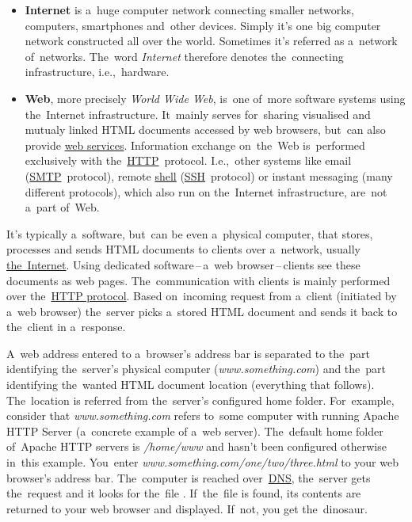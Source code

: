 \label{internetweb}
\begin{itemize}
    \item \textbf{Internet} is a~huge computer network connecting smaller networks, computers, smartphones and~other devices. Simply it's one big computer network constructed all over the world. Sometimes it's referred as a~network of~networks. The~word \textit{Internet} therefore denotes the~connecting infrastructure, i.e.,~hardware.
    \item \textbf{Web}, more precisely \textit{World Wide Web}, is~one of~more software systems using the~Internet infrastructure. It~mainly serves for~sharing visualised and mutualy linked HTML documents accessed by web browsers, but~can also provide \hyperref[webserviceapplication]{web services}. Information exchange on~the~Web is~performed exclusively with the~\hyperref[http]{HTTP}~protocol. I.e.,~other systems like email (\hyperref[smtp]{SMTP}~protocol), remote \hyperref[shellcligui]{shell} (\hyperref[ssh]{SSH}~protocol) or instant messaging (many different protocols), which also run on the~Internet infrastructure, are~not a~part of~Web.
\end{itemize}

\label{namespaces}

\label{webserver}
It's typically a~software, but~can be even a~physical computer, that stores, processes and sends HTML documents to clients over a~network, usually \hyperref[internetweb]{the~Internet}. Using dedicated software\,--\,a~web browser\,--\,clients see these documents as web pages. The~communication with clients is mainly performed over the~\hyperref[http]{HTTP protocol}. Based on~incoming request from a~client (initiated by a~web browser) the~server picks a~stored HTML document and sends it back to the~client in a~response.

A~web address entered to a~browser's address bar is separated to the~part identifying the~server's physical computer (\textit{www.something.com}) and the~part identifying the~wanted HTML document location (everything that follows). The~location is referred from the~server's configured home folder. For~example, consider that \textit{www.something.com} refers to~some computer with running Apache HTTP Server (a~concrete example of a~web server). The~default home folder of~Apache HTTP servers is \textit{/home/www} and hasn't been configured otherwise in~this example. You~enter \textit{www.something.com/one/two/three.html} to your web browser's address bar. The~computer is reached over~\hyperref[dns]{DNS}, the~server gets the~request and it looks for the~file . If~the~file is found, its contents are returned to your web browser and displayed. If~not, you get the~dinosaur.

